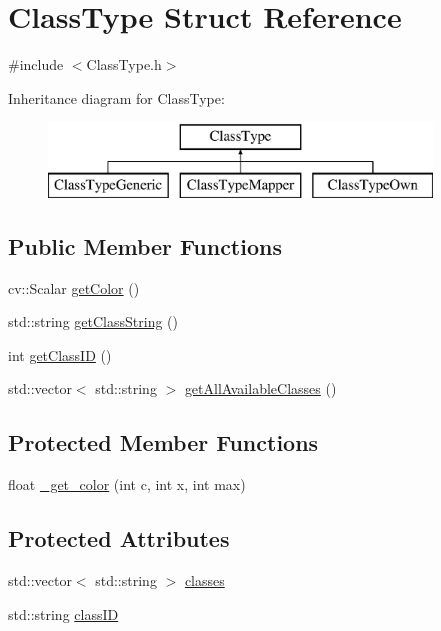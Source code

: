 \hypertarget{struct_class_type}{}\section{Class\+Type Struct Reference}
\label{struct_class_type}


{\ttfamily \#include $<$Class\+Type.\+h$>$}

Inheritance diagram for Class\+Type\+:\begin{figure}[H]
\begin{center}
\leavevmode
\includegraphics[height=2.000000cm]{struct_class_type}
\end{center}
\end{figure}
\subsection*{Public Member Functions}
\begin{DoxyCompactItemize}
\item 
cv\+::\+Scalar \hyperlink{struct_class_type_a72b048c816b2d1210e0cc0b258d6a1ee}{get\+Color} ()
\item 
std\+::string \hyperlink{struct_class_type_af6ce3dd95df43c13e50848cd930f4a25}{get\+Class\+String} ()
\item 
int \hyperlink{struct_class_type_ab5cc3bb3376a812d051d4726eb4ee063}{get\+Class\+ID} ()
\item 
std\+::vector$<$ std\+::string $>$ \hyperlink{struct_class_type_a867149836bb99711a7c14fbe7801c9e4}{get\+All\+Available\+Classes} ()
\end{DoxyCompactItemize}
\subsection*{Protected Member Functions}
\begin{DoxyCompactItemize}
\item 
float \hyperlink{struct_class_type_a37ea5c5449bc06ed3f2a327448abe02a}{\+\_\+get\+\_\+color} (int c, int x, int max)
\end{DoxyCompactItemize}
\subsection*{Protected Attributes}
\begin{DoxyCompactItemize}
\item 
std\+::vector$<$ std\+::string $>$ \hyperlink{struct_class_type_af453ca0ff4cf50bc7dc45272cc77565a}{classes}
\item 
std\+::string \hyperlink{struct_class_type_ae50867baa128ab7aabab4f900e03f9cc}{class\+ID}
\end{DoxyCompactItemize}


